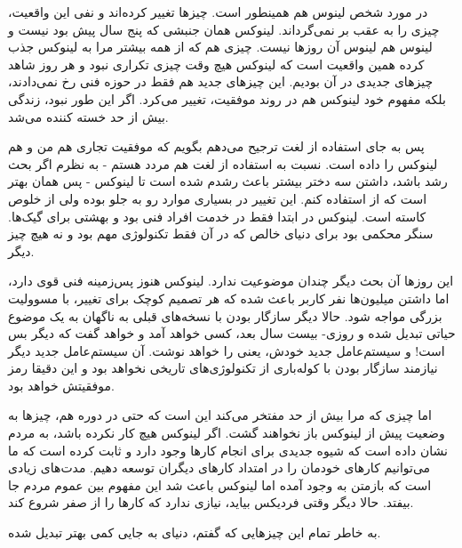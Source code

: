 در مورد شخص لینوس هم همینطور است. چیزها تغییر کرده‌اند و نفی این
واقعیت، چیزی را به عقب بر نمی‌گرداند. لینوکس همان جنبشی که پنج سال پیش
بود نیست و لینوس هم لینوس آن روزها نیست. چیزی هم که از همه بیشتر مرا
به لینوکس جذب کرده همین واقعیت است که لینوکس هیچ وقت چیزی تکراری نبود
و هر روز شاهد چیزهای جدیدی در آن بودیم. این چیزهای جدید هم فقط در حوزه
فنی رخ نمی‌دادند، بلکه مفهوم خود لینوکس هم در روند موفقیت، تغییر
می‌کرد. اگر این طور نبود، زندگی بیش از حد خسته کننده می‌شد.

پس به جای استفاده از لغت  ترجیح می‌دهم بگویم که موفقیت
تجاری هم من و هم لینوکس را  داده است. نسبت به استفاده
از لغت  هم مردد هستم - به نظرم اگر بحث رشد باشد،
داشتن سه دختر بیشتر باعث رشدم شده است تا لینوکس - پس همان بهتر است که
از  استفاده کنم. این تغییر در بسیاری موارد رو به جلو
بوده ولی از خلوص کاسته است. لینوکس در ابتدا فقط در خدمت افراد فنی بود
و بهشتی برای گیک‌ها. سنگر محکمی بود برای دنیای خالص که در آن فقط
تکنولوژی مهم بود و نه هیچ چیز دیگر.

این روزها آن بحث دیگر چندان موضوعیت ندارد. لینوکس هنوز پس‌زمینه فنی قوی
دارد، اما داشتن میلیون‌ها نفر کاربر باعث شده که هر تصمیم کوچک برای
تغییر، با مسوولیت بزرگی مواجه شود. حالا دیگر سازگار بودن با نسخه‌های
قبلی به ناگهان به یک موضوع حیاتی تبدیل شده و روزی- بیست سال بعد،‌ کسی
خواهد آمد و خواهد گفت که دیگر بس است! و سیستم‌عامل جدید خودش، یعنی
 را خواهد نوشت. آن سیستم‌عامل جدید دیگر
نیازمند سازگار بودن با کوله‌باری از تکنولوژی‌های تاریخی نخواهد بود و این
دقیقا رمز موفقیتش خواهد بود.

اما چیزی که مرا بیش از حد مفتخر می‌کند این است که حتی در دوره
 هم، چیزها به وضعیت پیش از لینوکس باز نخواهند گشت. اگر
لینوکس هیچ کار نکرده باشد، به مردم نشان داده است که شیوه جدیدی برای
انجام کارها وجود دارد و ثابت کرده است که ما می‌توانیم کارهای خودمان را
در امتداد کارهای دیگران توسعه دهیم. مدت‌های زیادی است که بازمتن به وجود
آمده اما لینوکس باعث شد این مفهوم بین عموم مردم جا بیفتد. حالا دیگر
وقتی فردیکس بیاید، نیازی ندارد که کارها را از صفر شروع کند.

به خاطر تمام این چیزهایی که گفتم، دنیای به جایی کمی بهتر تبدیل شده.

